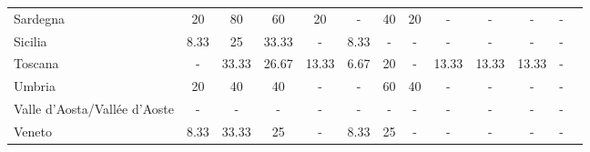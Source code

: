 \begin{table}[H]
\begin{tabularx}{\textwidth}{Xcccccccccccc}
            Sardegna & 20 & 80 & 60 & 20 & - & 40 & 20 & - & - & - & - \\
            Sicilia & 8.33 & 25 & 33.33 & - & 8.33 & - & - & - & - & - & - \\
            Toscana & - & 33.33 & 26.67 & 13.33 & 6.67 & 20 & - & 13.33 & 13.33 & 13.33 & - \\
            Umbria & 20 & 40 & 40 & - & - & 60 & 40 & - & - & - & - \\
            Valle d’Aosta/Vallée d’Aoste & - & - & - & - & - & - & - & - & - & - & - \\
            Veneto & 8.33 & 33.33 & 25 & - & 8.33 & 25 & - & - & - & - & - \\
        \bottomrule
    \end{tabularx}
\end{table}
    